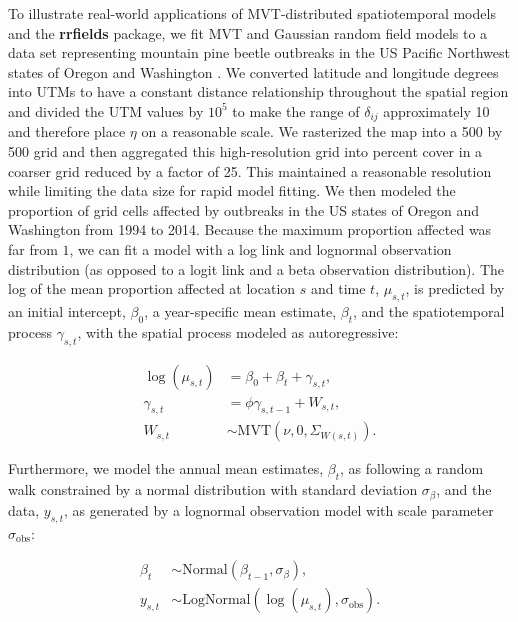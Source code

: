 \documentclass[12pt,english]{article}
\begin{document}
\begin{spacing}{1.3}
To illustrate real-world applications of MVT-distributed
spatiotemporal models and the \textbf{rrfields} package,
we fit MVT and Gaussian random field models
to a data set representing
mountain pine beetle outbreaks in the
US Pacific Northwest states of Oregon and Washington \citep{usdaforestservice2017}.
We converted latitude and longitude degrees into UTMs to have a constant
distance relationship throughout the spatial region and divided the UTM values
by $10^5$ to make the range of $\delta_{ij}$ approximately 10 and therefore
place $\eta$ on a reasonable scale.
We rasterized the map into a 500 by 500 grid
and then aggregated this high-resolution grid
into percent cover in a coarser grid reduced by a factor of 25.
This maintained a reasonable resolution
while limiting the data size for rapid model fitting.
We then modeled the
proportion of grid cells affected by outbreaks
in the US states of Oregon and Washington from 1994 to 2014.
Because the maximum proportion affected was far from $1$, we
can fit a model with a log link and lognormal observation distribution
(as opposed to a logit link and a beta observation distribution).
The log of the mean proportion affected at location $s$ and time $t$, $\mu_{s,t}$,
is predicted by an initial intercept, $\beta_0$, a year-specific mean estimate, $\beta_t$,
and the spatiotemporal process $\gamma_{s,t}$,
with the spatial process modeled as autoregressive:


\begin{align}
  \log(\mu_{s,t}) &= \beta_0 + \beta_t + \gamma_{s,t},\\
  \gamma_{s,t} &= \phi \gamma_{s,t-1} + W_{s,t},\\ \label{eq:beetle-mu}
  W_{s,t} &\sim \mathrm{MVT}\left(\nu, 0, \Sigma_{W(s,t)}\right).
\end{align}

\noindent Furthermore, we model the annual
mean estimates, $\beta_t$, as following a random walk
constrained by a normal distribution with standard deviation $\sigma_{\beta}$,
and the data, $y_{s,t}$, as generated by a lognormal observation model
with scale parameter $\sigma_{\mathrm{obs}}$:

 \begin{align}
 \beta_t &\sim \mathrm{Normal}\left( \beta_{t-1}, \sigma_{\beta} \right),\\
  y_{s,t} &\sim \mathrm{LogNormal} \left(  \log(\mu_{s,t}), \sigma_{\mathrm{obs}} \right).
 \end{align}


\end{spacing}
\end{document}
